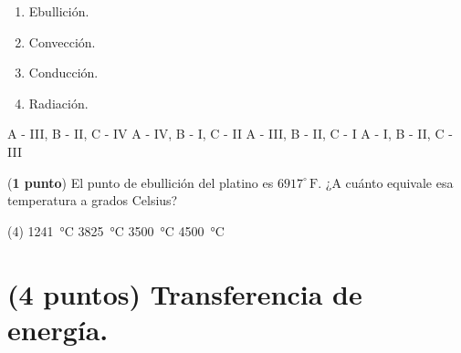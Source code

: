 \documentclass[12pt, letter]{exam}
\newcommand{\Fahrenheit}[1]{{#1}^{\circ} \, \text{F}}
\begin{document}
\begin{questions}
\begin{figure}[H]
    \end{figure}
    \begin{multicols}{4}
    \begin{enumerate}[label=\Roman*)]
        \item Ebullición.
        \item Convección.
        \item Conducción.
        \item Radiación.
    \end{enumerate}
    \end{multicols}
    \begin{tasks}
        \task A - III, B - II, C - IV
        \task A - IV, B - I, C - II
        \task A - III, B - II, C - I
        \task A - I, B - II, C - III
    \end{tasks}
    \question (\textbf{1 punto}) El punto de ebullición del platino es $\Fahrenheit{6917}$. ¿A cuánto equivale esa temperatura a grados Celsius?
    \begin{tasks}(4)
        \task \SI{1241}{\degreeCelsius}
        \task \SI{3825}{\degreeCelsius}
        \task \SI{3500}{\degreeCelsius}
        \task \SI{4500}{\degreeCelsius}
    \end{tasks}
   
    \section{(4 puntos) Transferencia de energía.}


\end{questions}
\end{document}
